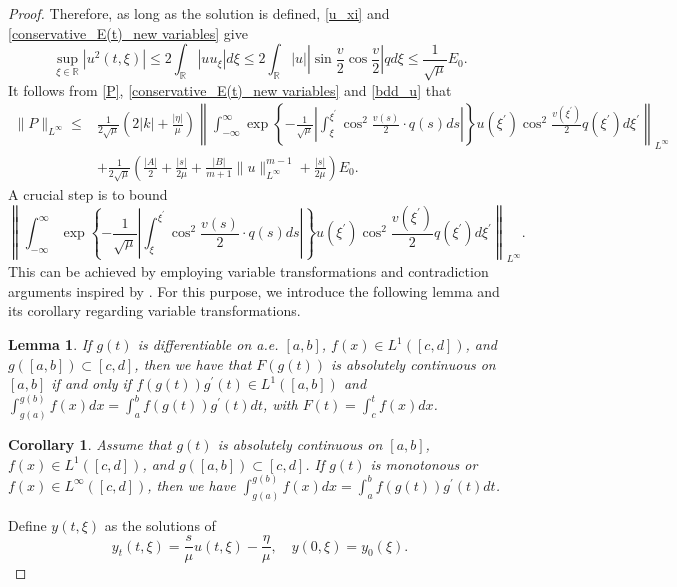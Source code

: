 \documentclass[10pt]{article}
\newtheorem{lemm}[theo]{Lemma}
\newtheorem{coro}[theo]{Corollary}
\numberwithin{equation}{section}
\begin{document}
\begin{proof}
		Therefore, as long as the solution is defined, \eqref{u_xi} and \eqref{conservative_E(t)_new variables} give
		\begin{equation}\label{bdd_u}
			\sup_{\xi\in\mathbb{R}}|u^{2}(t,\xi)| \leq 2\int_\mathbb{R}|uu_\xi|d\xi  \leq2\int_\mathbb{R}|u||\sin\frac{v}{2}\cos\frac{v}{2}|qd\xi\leq \frac{1}{\sqrt{\mu}}E_0.
		\end{equation}
		It follows from \eqref{P}, \eqref{conservative_E(t)_new variables} and \eqref{bdd_u} that
		\begin{align*}
			\|P\|_{L^\infty}\leq&\frac{1}{2\sqrt{\mu}}\left(2|k|+\frac{|\eta|}{\mu}\right)\left\|\int_{-\infty}^{\infty}\exp\left\{-\frac{1}{\sqrt{\mu}}\left|\int_{\xi}^{\xi^{\prime}}\cos^{2}\frac{v(s)}{2}\cdot q(s)ds\right|\right\}u(\xi^{\prime})\cos^2\frac{v(\xi^{\prime})}{2}q(\xi^{\prime})d\xi^{\prime}\right\|_{L^\infty}\\
			&+\frac{1}{2\sqrt{\mu}}\left(\frac{|A|}{2}+\frac{|s|}{2\mu}+\frac{|B|}{m+1}\|u\|_{L^\infty}^{m-1}+\frac{|s|}{2\mu}\right)E_0.
		\end{align*}
		A crucial step is to bound
		$$\left\|\int_{-\infty}^{\infty}\exp\left\{-\frac{1}{\sqrt{\mu}}\left|\int_{\xi}^{\xi^{\prime}}\cos^{2}\frac{v(s)}{2}\cdot q(s)ds\right|\right\}u(\xi^{\prime})\cos^2\frac{v(\xi^{\prime})}{2}q(\xi^{\prime})d\xi^{\prime}\right\|_{L^\infty}.$$
		This can be achieved by employing variable transformations and contradiction arguments inspired by \cite{luo2021globally}. For this purpose, we introduce the following lemma and its corollary regarding variable transformations.
		\begin{lemm}\cite{Zhou2008RealVariables}
			If $g(t)$ is differentiable on a.e. $[a,b]$, $f(x)\in L^1([c,d])$, and $g([a, b])\subset[c,d]$, then we have that $F(g(t))$ is absolutely
			continuous on $[a,b]$ if and only if $f(g(t))g^{\prime}(t)\in L^{1}([a,b])$ and $\int_{g(a)}^{g(b)}f(x)dx=\int_{a}^{b}f(g(t))g^{\prime}(t)dt$, with $F(t)=\int_{c}^{t}f(x)dx$.
		\end{lemm}
		\begin{coro}\cite{Zhou2008RealVariables}\label{cor}
			Assume that $g(t)$ is absolutely continuous on $[a,b]$, $f(x)\in L^1([c,d])$, and $g([a,b])\subset[c,d]$. If $g(t)$ is monotonous
			or $f(x)\in L^\infty([c,d])$, then we have $\int_{g(a)}^{g(b)}f(x)dx=\int_{a}^{b}f(g(t))g^{\prime}(t)dt$.
		\end{coro}
		Define $y(t,\xi)$ as the solutions of 
		\begin{equation}\label{partial_t y(t,xi)}
			y_t(t,\xi)=\frac{s}{\mu}u(t,\xi)-\frac{\eta}{\mu},\quad y(0,\xi)=y_0(\xi).

\end{equation}
\end{proof}
\end{document}
